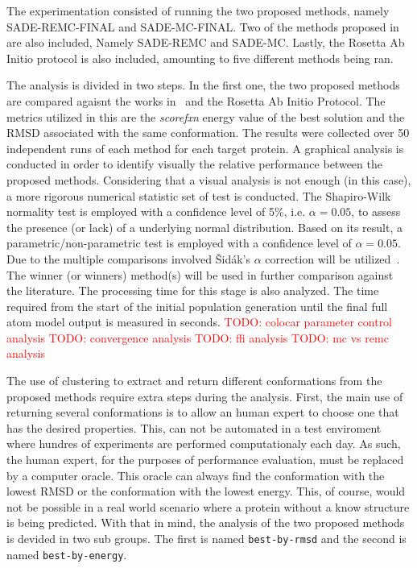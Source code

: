 The experimentation consisted of running the two proposed methods, namely
SADE-REMC-FINAL and SADE-MC-FINAL. Two of the methods proposed
in~\cite{silva2019self} are also included, Namely SADE-REMC and SADE-MC.
Lastly, the Rosetta Ab Initio protocol is also included, amounting to five
different methods being ran.

The analysis is divided in two steps. In the first one, the two proposed methods
are compared agaisnt the works in~\cite{silva2019self} and the Rosetta Ab Initio
Protocol.
The metrics utilized in this are the \textit{scorefxn} energy value of the
best solution and the \ac{RMSD} associated with the same conformation. The
results were collected over 50 independent runs of each method for each target
protein. A graphical analysis is conducted in order to identify visually the
relative performance between the proposed methods. Considering that a visual
analysis is not enough (in this case), a more rigorous numerical statistic set
of test is conducted.  The Shapiro-Wilk~\cite{wilk1968joint} normality test is
employed with a confidence level of 5\%, i.e. $\alpha = 0.05$, to assess the
presence (or lack) of a underlying normal distribution. Based on its result, a
parametric/non-parametric test is employed with a confidence level of $\alpha =
0.05$. Due to the multiple comparisons involved \v{S}idák's $\alpha$ correction
will be utilized~\cite{vsidak1967rectangular}. The winner (or winners)
method(s) will be used in further comparison against the literature. The
processing time for this stage is also analyzed. The time required from the
start of the initial population generation until the final full atom model
output is measured in seconds.
\textcolor{red}{TODO: colocar parameter control analysis}
\textcolor{red}{TODO: convergence analysis}
\textcolor{red}{TODO: ffi analysis}
\textcolor{red}{TODO: mc vs remc analysis}

The use of clustering to extract and return different conformations from the
proposed methods require extra steps during the analysis. First, the main use of
returning several conformations is to allow an human expert to choose one that
has the desired properties. This, can not be automated in a test enviroment where
hundres of experiments are performed computationaly each day. As such, the human
expert, for the purposes of performance evaluation, must be replaced by a
computer oracle. This oracle can always find the conformation with the lowest
RMSD or the conformation with the lowest energy. This, of course, would not
be possible in a real world scenario where a protein without a know structure is
being predicted. With that in mind, the analysis of the two proposed methods is
devided in two sub groups. The first is named \texttt{best-by-rmsd} and the second
is named \texttt{best-by-energy}.

